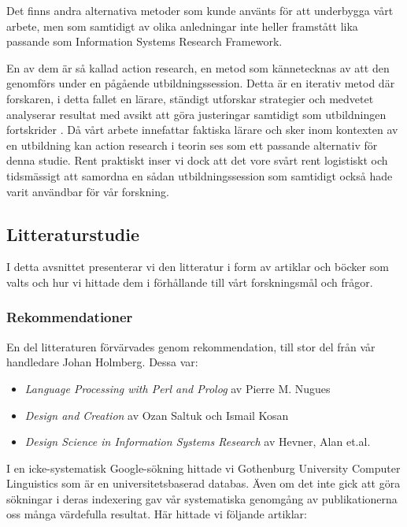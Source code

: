 \documentclass[swedish]{maucsthesis}
\begin{document}
Det finns andra alternativa metoder som kunde använts för att underbygga vårt
arbete, men som samtidigt av olika anledningar inte heller framstått lika
passande som Information Systems Research Framework.

En av dem är så kallad action research, en metod som kännetecknas av att den
genomförs under en pågående utbildningssession. Detta är en iterativ metod där
forskaren, i detta fallet en lärare, ständigt utforskar strategier och medvetet
analyserar resultat med avsikt att göra justeringar samtidigt som utbildningen
fortskrider \citep{clement:2004}. Då vårt arbete innefattar faktiska lärare och
sker inom kontexten av en utbildning kan action research i teorin ses som ett
passande alternativ för denna studie. Rent praktiskt inser vi dock att det vore
svårt rent logistiskt och tidsmässigt att samordna en sådan utbildningssession
som samtidigt också hade varit användbar för vår forskning.

\subsection{Litteraturstudie}

I detta avsnittet presenterar vi den litteratur i form av artiklar och böcker
som valts och hur vi hittade dem i förhållande till vårt forskningsmål och
frågor.

\subsubsection{Rekommendationer}

En del litteraturen förvärvades genom rekommendation, till stor del från vår
handledare Johan Holmberg. Dessa var:
\begin{itemize}
\item \textit{Language Processing with Perl and Prolog} av Pierre M. Nugues
\item \textit{Design and Creation} av Ozan Saltuk och Ismail Kosan
\item \textit{Design Science in Information Systems Research} av Hevner, Alan et.al.
\end{itemize}

I en icke-systematisk Google-sökning hittade vi Gothenburg University Computer
Linguistics som är en universitetsbaserad databas. Även om det inte gick att
göra sökningar i deras indexering gav vår systematiska genomgång av
publikationerna oss många värdefulla resultat. Här hittade vi följande artiklar:
\end{document}
